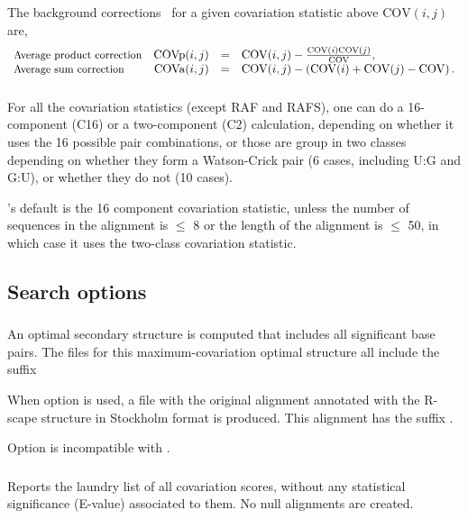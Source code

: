 The background corrections~\citep{DunnGloor07} for a given
covariation statistic above $\mathrm{COV}(i,j)$ are,
%
\[
\begin{array}{lrcl}
  \mbox{\small Average product correction} & \mathrm{COVp}(i,j) & = &  \mathrm{COV}(i,j) - \frac { \mathrm{COV}(i) \mathrm{COV}(j) } { \mathrm{COV} }, \\
  \mbox{\small Average sum correction}     & \mathrm{COVa}(i,j) & = &  \mathrm{COV}(i,j) - \left( \mathrm{COV}(i) + \mathrm{COV}(j) - \mathrm{COV} \right). \\
\end{array}
\]



\subsubsection{}
For all the covariation statistics (except RAF and RAFS), one can do a
16-component (C16) or a two-component (C2) calculation, depending on
whether it uses the 16 possible pair combinations, or those are group
in two classes depending on whether they form a Watson-Crick pair (6
cases, including U:G and G:U), or whether they do not (10 cases).

\rscape's default is the 16 component covariation statistic, unless
the number of sequences in the alignment is $\leq$ 8 or the length of
the alignment is $\leq$ 50, in which case it uses the two-class
covariation statistic.

\subsection{Search options}

\subsubsection{} An optimal secondary structure is computed that includes all significant base pairs. The files for this
maximum-covariation optimal structure all include the suffix

When option  is used, a file with the original alignment  annotated with the R-scape structure in Stockholm format is produced.
This alignment has the suffix .

Option  is incompatible with .

\subsubsection{} Reports the laundry list of all covariation scores, without any statistical significance (E-value)
associated to them. No null alignments are created.

